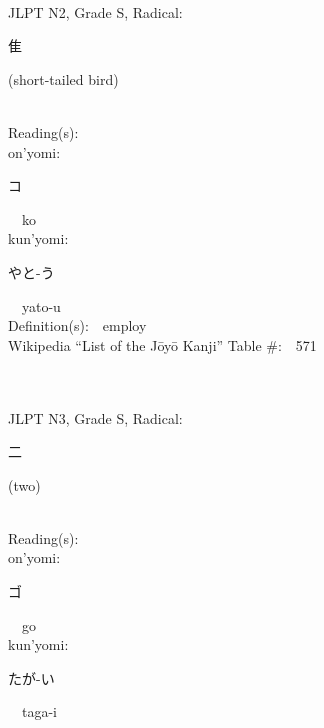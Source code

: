 \begin{multicols}{2}
{\fontsize{34pt}{40pt}  }\ \ \\  %
{JLPT N2, Grade S, Radical:\ \ {\begin{CJK}{UTF8}{min} 隹 \end{CJK}} (short-tailed bird) } \\
Reading(s):\ \ \\
{\hspace*{1em}}on'yomi:\ \ \\
{\hspace*{2em}}{\begin{CJK}{UTF8}{min} コ \end{CJK}}\ \ ko\ \ \\
{\hspace*{1em}}kun'yomi:\ \ \\
{\hspace*{2em}}{\begin{CJK}{UTF8}{min} やと-う \end{CJK}}\ \ yato-u\ \ \\
Definition(s):\ \ employ \\
Wikipedia ``List of the J\=oy\=o Kanji'' Table \#:\ \ 571 \\
\ \ \\
{\fontsize{34pt}{40pt}  }\ \ \\  %
{JLPT N3, Grade S, Radical:\ \ {\begin{CJK}{UTF8}{min} 二 \end{CJK}} (two) } \\
Reading(s):\ \ \\
{\hspace*{1em}}on'yomi:\ \ \\
{\hspace*{2em}}{\begin{CJK}{UTF8}{min} ゴ \end{CJK}}\ \ go\ \ \\
{\hspace*{1em}}kun'yomi:\ \ \\
{\hspace*{2em}}{\begin{CJK}{UTF8}{min} たが-い \end{CJK}}\ \ taga-i\ \ \\

\end{multicols}
